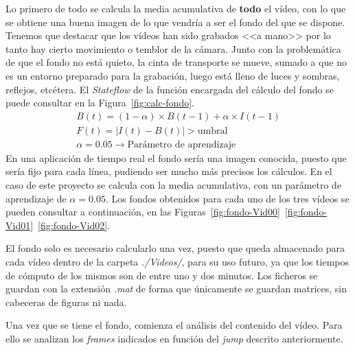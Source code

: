 \documentclass[11pt]{memoir}
\begin{document}
Lo primero de todo se calcula la media acumulativa de \textbf{todo} el vídeo, con lo que se obtiene una buena imagen de lo que vendría a ser el fondo del que se dispone. Tenemos que destacar que los vídeos han sido grabados <<a mano>> por lo tanto hay cierto movimiento o temblor de la cámara. Junto con la problemática de que el fondo no está quieto, la cinta de transporte se mueve, sumado a que no es un entorno preparado para la grabación, luego está lleno de luces y sombras, reflejos, etcétera. El \textit{Stateflow} de la función encargada del cálculo del fondo se puede consultar en la Figura~\ref{fig:calc-fondo}.
\begin{align*}
	B(t)  = \left(1-\alpha\right) \times B\left(t-1\right) + \alpha \times I\left(t-1\right) \\
	F(t) = \left| I(t) - B(t)\right| > \text{umbral} \\	
	\alpha = 0.05 \rightarrow \text{Parámetro de aprendizaje}
\end{align*}
En una aplicación de tiempo real el fondo sería una imagen conocida, puesto que sería fijo para cada línea, pudiendo ser mucho más precisos los cálculos. En el caso de este proyecto se calcula con la media acumulativa, con un parámetro de aprendizaje de $\alpha = 0.05$. Los fondos obtenidos para cada uno de los tres vídeos se pueden consultar a continuación, en las Figuras~\ref{fig:fondo-Vid00}~\ref{fig:fondo-Vid01}~\ref{fig:fondo-Vid02}. 

El fondo solo es necesario calcularlo una vez, puesto que queda almacenado para cada vídeo dentro de la carpeta \textit{./Videos/}, para su uso futuro, ya que los tiempos de cómputo de los mismos son de entre uno y dos minutos. Los ficheros se guardan con la extensión \textit{.mat} de forma que únicamente se guardan matrices, sin cabeceras de figuras ni nada.

Una vez que se tiene el fondo, comienza el análisis del contenido del vídeo. Para ello se analizan los \textit{frames} indicados en función del \textit{jump} descrito anteriormente.
\end{document}
